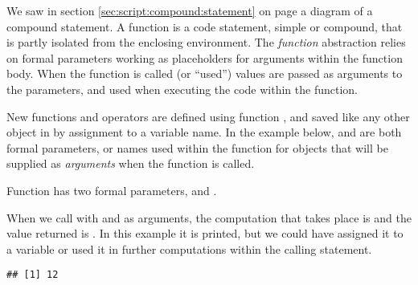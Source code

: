 \documentclass[krantz2]{krantz}\usepackage{knitr}
\begin{document}
We saw in section \ref{sec:script:compound:statement} on page \pageref{sec:script:compound:statement} a diagram of a compound statement. A function is a code statement, simple or compound, that is partly isolated from the enclosing environment. The \emph{function} abstraction relies on formal parameters working as placeholders for arguments within the function body. When the function is called (or ``used'') values are passed as arguments to the parameters, and used when executing the code within the function.

New functions and operators are defined using function , and saved like any other object in \Rlang by assignment to a variable name. In the example below,  and  are both formal parameters, or names used within the function for objects that will be supplied as \emph{arguments} when the function is called.

Function  has two formal parameters,  and .

\begin{knitrout}\footnotesize
{}\color{fgcolor}\begin{kframe}
\begin{alltt}
 \hlkwb{<-} \hlstd{(}\hlstd{,}  \hlopt{*} 
\end{alltt}
\end{kframe}
\end{knitrout}

When we call  with  and  as arguments, the computation that takes place is  and the value returned is . In this example it is printed, but we could have assigned it to a variable or used it in further computations within the calling statement.

\begin{knitrout}\footnotesize
{}\color{fgcolor}\begin{kframe}
\begin{alltt}
\hlstd{(} \hlstd{=} \hlstd{,}  \hlstd{=} \hlstd{)}
\end{alltt}
\begin{verbatim}
## [1] 12
\end{verbatim}
\end{kframe}
\end{knitrout}
\end{document}
